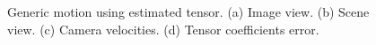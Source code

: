 \begin{figure}[ht!]
\begin{subfigure}{.48\linewidth}
    \caption{}
    \label{fig:ex5cerror}
  \end{subfigure}
  \caption{Generic motion using estimated tensor. (a) Image view. (b) Scene view. (c) Camera velocities. (d) Tensor coefficients error.}
  \label{fig:ex5c}
\end{figure}

